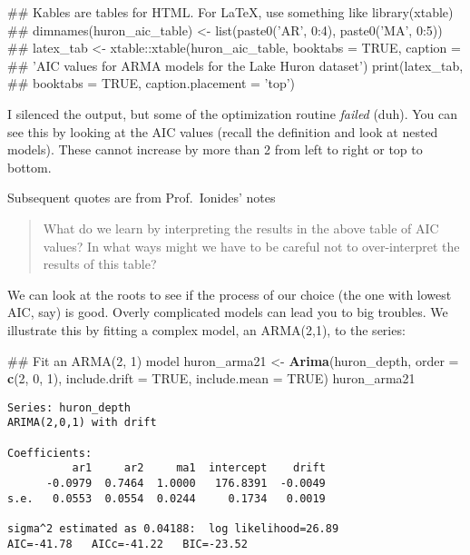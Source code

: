 \documentclass[]{book}
\newenvironment{Shaded}{\begin{snugshade}}{\end{snugshade}}
\newcommand{\KeywordTok}[1]{\textcolor[rgb]{0.13,0.29,0.53}{\textbf{#1}}}
\newcommand{\DataTypeTok}[1]{\textcolor[rgb]{0.13,0.29,0.53}{#1}}
\newcommand{\DecValTok}[1]{\textcolor[rgb]{0.00,0.00,0.81}{#1}}
\newcommand{\StringTok}[1]{\textcolor[rgb]{0.31,0.60,0.02}{#1}}
\newcommand{\OtherTok}[1]{\textcolor[rgb]{0.56,0.35,0.01}{#1}}
\newcommand{\NormalTok}[1]{#1}
\begin{document}
\begin{Shaded}
\begin{Highlighting}[]
\NormalTok{## Kables are tables for HTML. For LaTeX, use something like library(xtable)}
\NormalTok{## dimnames(huron_aic_table) <- list(paste0('AR', 0:4), paste0('MA', 0:5))}
\NormalTok{## latex_tab <- xtable::xtable(huron_aic_table, booktabs = TRUE, caption =}
\NormalTok{## 'AIC values for ARMA models for the Lake Huron dataset') print(latex_tab,}
\NormalTok{## booktabs = TRUE, caption.placement = 'top')}
\end{Highlighting}
\end{Shaded}

I silenced the output, but some of the optimization routine
\emph{failed} (duh). You can see this by looking at the AIC values
(recall the definition and look at nested models). These cannot increase
by more than 2 from left to right or top to bottom.

Subsequent quotes are from Prof.~Ionides' notes

\begin{quote}
What do we learn by interpreting the results in the above table of AIC
values? In what ways might we have to be careful not to over-interpret
the results of this table?
\end{quote}

We can look at the roots to see if the process of our choice (the one
with lowest AIC, say) is good. Overly complicated models can lead you to
big troubles. We illustrate this by fitting a complex model, an
ARMA(2,1), to the series:

\begin{Shaded}
\begin{Highlighting}[]
\NormalTok{## Fit an ARMA(2, 1) model}
\NormalTok{huron_arma21 <-}\StringTok{ }\KeywordTok{Arima}\NormalTok{(huron_depth, }\DataTypeTok{order =} \KeywordTok{c}\NormalTok{(}\DecValTok{2}\NormalTok{, }\DecValTok{0}\NormalTok{, }\DecValTok{1}\NormalTok{), }\DataTypeTok{include.drift =} \OtherTok{TRUE}\NormalTok{, }
    \DataTypeTok{include.mean =} \OtherTok{TRUE}\NormalTok{)}
\NormalTok{huron_arma21}
\end{Highlighting}
\end{Shaded}

\begin{verbatim}
Series: huron_depth 
ARIMA(2,0,1) with drift 

Coefficients:
          ar1     ar2     ma1  intercept    drift
      -0.0979  0.7464  1.0000   176.8391  -0.0049
s.e.   0.0553  0.0554  0.0244     0.1734   0.0019

sigma^2 estimated as 0.04188:  log likelihood=26.89
AIC=-41.78   AICc=-41.22   BIC=-23.52
\end{verbatim}
\end{document}
